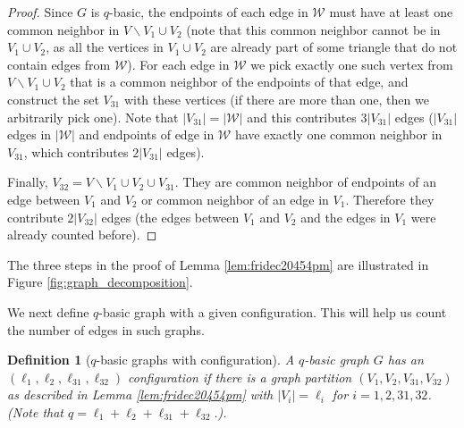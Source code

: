 \documentclass[bj,authoryear,noshowframe]{imsart}
\numberwithin{equation}{section}
\theoremstyle{plain}
\newtheorem{dfn}[thm]{Definition}
\theoremstyle{definition}
\renewcommand{\setminus}{\backslash}
\begin{document}
\begin{proof}
\par
Since $G$ is $q$-basic, the endpoints of each edge in $\mathcal{W}$ must have at least one common neighbor in $V\setminus V_1 \cup V_2$ (note that this common neighbor cannot be in $V_1 \cup V_2$, as all the vertices in $V_1 \cup V_2$ are already part of some triangle that do not contain edges from $\mathcal{W}$). For each edge in $\mathcal{W}$ we pick exactly one such vertex from $V\setminus V_1 \cup V_2$ that is a common neighbor of the endpoints of that edge, and construct the set $V_{31}$ with these vertices (if there are more than one, then we arbitrarily pick one). Note that $|V_{31}|=|\mathcal{W}|$ and this contributes $3|V_{31}|$ edges ($|V_{31}|$ edges in $|\mathcal{W}|$ and endpoints of edge in $\mathcal{W}$ have exactly one common neighbor in $V_{31}$, which contributes $2|V_{31}|$ edges).
\par
Finally, $V_{32}= V\setminus V_1\cup V_2 \cup V_{31}$. They are common neighbor of endpoints of an edge between $V_1$ and $V_2$ or common neighbor of an edge in $V_1$. Therefore they contribute $2|V_{32}|$ edges (the edges between $V_1$ and $V_2$ and the edges in $V_1$ were already counted before).
\end{proof}

\noindent
The three steps in the proof of Lemma \ref{lem:fridec20454pm} are illustrated in Figure \ref{fig:graph_decomposition}. 

We next define $q$-basic graph with a given configuration. This will help us count the number of edges in such graphs. 

\begin{dfn}[$q$-basic graphs with configuration]
\label{def-q-basic_config}
{\rm A $q$-basic graph $G$ has an $(\ell_1,\ell_2,\ell_{31},\ell_{32})$ configuration if there is a graph partition $(V_1,V_2, V_{31}, V_{32})$ as described in Lemma \ref{lem:fridec20454pm} with $|V_i|=\ell_i$ for $i=1,2, 31, 32$. (Note that $q=\ell_1+\ell_2+\ell_{31}+ \ell_{32}$.).}
\end{dfn}
\end{document}
